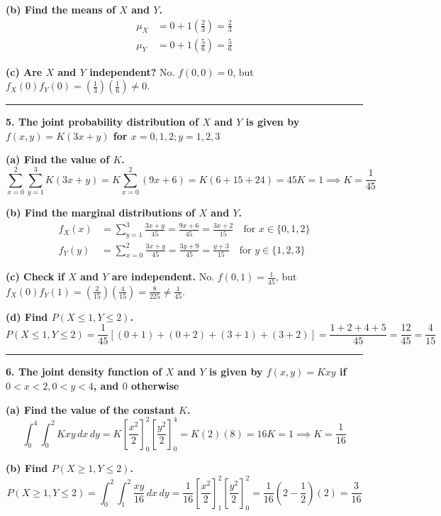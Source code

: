 \documentclass{article}
\begin{document}
\textbf{(b) Find the means of $X$ and $Y$.}
\begin{align*}
\mu_X &= 0 + 1\left(\frac{2}{3}\right) = \frac{2}{3} \\
\mu_Y &= 0 + 1\left(\frac{5}{6}\right) = \frac{5}{6}
\end{align*}

\textbf{(c) Are $X$ and $Y$ independent?}
No. $f(0,0) = 0$, but $f_X(0)f_Y(0) = \left(\frac{1}{3}\right)\left(\frac{1}{6}\right) \neq 0$.

\vspace{1em}
\hrule
\vspace{1em}

\textbf{5. The joint probability distribution of $X$ and $Y$ is given by $f(x,y) = K(3x+y)$ for $x = 0,1,2; y = 1,2,3$}

\textbf{(a) Find the value of $K$.}
$$\sum_{x=0}^{2} \sum_{y=1}^{3} K(3x+y) = K \sum_{x=0}^{2} (9x+6) = K(6 + 15 + 24) = 45K = 1 \implies K = \frac{1}{45}$$

\textbf{(b) Find the marginal distributions of $X$ and $Y$.}
\begin{align*}
f_X(x) &= \sum_{y=1}^{3} \frac{3x+y}{45} = \frac{9x+6}{45} = \frac{3x+2}{15} \quad \text{for } x \in \{0,1,2\} \\
f_Y(y) &= \sum_{x=0}^{2} \frac{3x+y}{45} = \frac{3y+9}{45} = \frac{y+3}{15} \quad \text{for } y \in \{1,2,3\}
\end{align*}

\textbf{(c) Check if $X$ and $Y$ are independent.}
No. $f(0,1) = \frac{1}{45}$, but $f_X(0)f_Y(1) = \left(\frac{2}{15}\right)\left(\frac{4}{15}\right) = \frac{8}{225} \neq \frac{1}{45}$.

\textbf{(d) Find $P(X \le 1,Y \le 2)$.}
$$P(X \le 1, Y \le 2) = \frac{1}{45} [ (0+1) + (0+2) + (3+1) + (3+2) ] = \frac{1+2+4+5}{45} = \frac{12}{45} = \frac{4}{15}$$

\vspace{1em}
\hrule
\vspace{1em}

\textbf{6. The joint density function of $X$ and $Y$ is given by $f(x,y) = Kxy$ if $0 < x < 2, 0 < y < 4$, and $0$ otherwise}

\textbf{(a) Find the value of the constant $K$.}
$$\int_{0}^{4} \int_{0}^{2} Kxy \,dx \,dy = K \left[ \frac{x^2}{2} \right]_0^2 \left[ \frac{y^2}{2} \right]_0^4 = K (2) (8) = 16K = 1 \implies K = \frac{1}{16}$$

\textbf{(b) Find $P(X \ge 1, Y \le 2)$.}
$$P(X \ge 1, Y \le 2) = \int_{0}^{2} \int_{1}^{2} \frac{xy}{16} \,dx \,dy = \frac{1}{16} \left[ \frac{x^2}{2} \right]_1^2 \left[ \frac{y^2}{2} \right]_0^2 = \frac{1}{16} \left(2 - \frac{1}{2}\right)(2) = \frac{3}{16}$$
\end{document}

